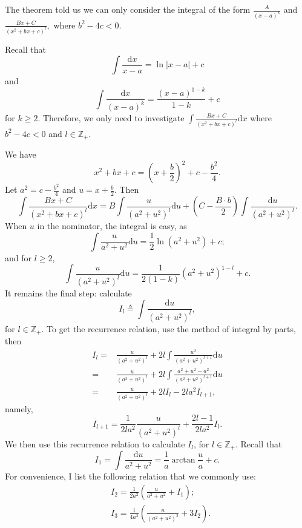 \documentclass[12pt,a4paper]{article}
\numberwithin{equation}{section}
\theoremstyle{mystyle}
\newcommand{\Z}{\mathbb{Z}}
\renewcommand{\d}{\mathrm{d}}
\newcommand{\abs}[1]{\left\lvert #1 \right\rvert}
\begin{document}
	The theorem told us we can only consider the integral of the form
	$\frac{A}{(x-a)^k}$ and $ \frac{Bx+C}{(x^2+bx+c)^l},$
	where $b^2-4c<0$.
	
	Recall that $$\int \frac{\d x}{x-a} = \ln \abs{x-a}+c$$ and $$\int\frac{\d x}{(x-a)^k}=\frac{(x-a)^{1-k}}{1-k}+c$$ for $k\geq 2$. Therefore, we only need to investigate $\int  \frac{Bx+C}{(x^2+bx+c)^l} \d x$ where $b^2-4c<0$ and $l\in \Z_{+}$.
	
	We have 
	$$
	x^2+bx+c=(x+\frac{b}{2})^2+c-\frac{b^2}{4}.
	$$
	Let $a^2=c-\frac{b^2}{4}$ and $u=x+\frac{b}{2}$. Then
	\[
	\int  \frac{Bx+C}{(x^2+bx+c)^l} \d x = B\int \frac{u}{(a^2+u^2)^l}\d u+(C-\frac{B\cdot b}{2})\int \frac{\d u}{(a^2+u^2)^l}.
	\]
	When $u$ in the nominator, the integral is easy, as 
	$$
	\int \frac{u}{a^2+u^2}\d u=\frac{1}{2}\ln (a^2+u^2)+c;$$ and for $l\geq 2$, 
	$$
	\int \frac{u}{(a^2+u^2)^l}\d u=\frac{1}{2(1-k)}(a^2+u^2)^{1-l}+c.
	$$ It remains the final step: calculate $$I_l\triangleq \int \frac{\d u}{(a^2+u^2)^l},$$ for $l\in \Z_+$.
	To get the recurrence relation, use the method of integral by parts, then
	\begin{align*}
		I_l =& \frac{u}{(a^2+u^2)^l}+2l\int \frac{u^2}{(a^2+u^2)^{l+1}}\d u\\
		=&\frac{u}{(a^2+u^2)^l}+2l\int\frac{a^2+u^2-a^2}{(a^2+u^2)^{l+1}}\d u\\
		=& \frac{u}{(a^2+u^2)^l}+2l I_l - 2la^2 I_{l+1},
	\end{align*}
	namely,
	\begin{equation}
		I_{l+1}=\frac{1}{2la^2}\frac{u}{(a^2+u^2)^l}+\frac{2l-1}{2la^2}I_l.
	\end{equation}
	We then use this recurrence relation to calculate $I_l$, for $l\in \Z_+$. Recall that 
	$$
	I_1=\int \frac{\d u}{a^2+u^2} = \frac{1}{a}\arctan{\frac{u}{a}}+c.
	$$
	For convenience, I list the following relation that we commonly use:
	\begin{align}
		&I_2=\frac{1}{2a^2}\left(\frac{u}{a^2+u^2}+I_1\right);\\
		&I_3 = \frac{1}{4a^2}\left(\frac{u}{(a^2+u^2)^2}+3I_2\right).
	\end{align}
	
	
	
	
	
	
	
	
	\appendix
	
	 
\end{document}
